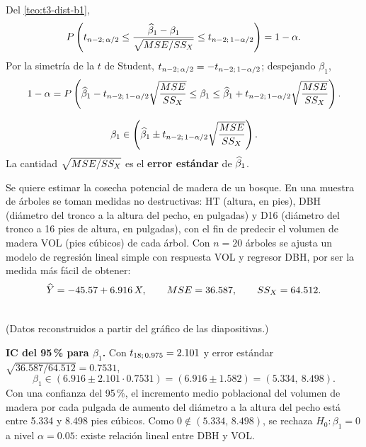 Del \cref{teo:t3-dist-b1},
\[
  P\left(t_{n-2;\,\alpha/2} \le \frac{\widehat{\beta}_1-\beta_1}{\sqrt{MSE/SS_X}}
  \le t_{n-2;\,1-\alpha/2}\right) = 1-\alpha .
\]
Por la simetría de la $t$ de Student, $t_{n-2;\,\alpha/2}=-t_{n-2;\,1-\alpha/2}$; despejando
$\beta_1$,
\[
  1-\alpha = P\left(\widehat{\beta}_1-t_{n-2;\,1-\alpha/2}\sqrt{\frac{MSE}{SS_X}}
  \le \beta_1 \le
  \widehat{\beta}_1+t_{n-2;\,1-\alpha/2}\sqrt{\frac{MSE}{SS_X}}\right).
\]

\begin{resumen}
  \[
    \beta_1 \in \left(\widehat{\beta}_1 \pm t_{n-2;\,1-\alpha/2}\sqrt{\frac{MSE}{SS_X}}\right).
  \]
  La cantidad $\sqrt{MSE/SS_X}$ es el \textbf{error estándar} de $\widehat{\beta}_1$.
\end{resumen}

\begin{ejemplo}
  Se quiere estimar la cosecha potencial de madera de un bosque. En una muestra de árboles se
  toman medidas no destructivas: HT (altura, en pies), DBH (diámetro del tronco a la altura del
  pecho, en pulgadas) y D16 (diámetro del tronco a 16 pies de altura, en pulgadas), con el fin
  de predecir el volumen de madera VOL (pies cúbicos) de cada árbol. Con $n=20$ árboles se
  ajusta un modelo de regresión lineal simple con respuesta VOL y regresor DBH, por ser la
  medida más fácil de obtener:
  \[
    \widehat{Y} = -45.57 + 6.916\,X, \qquad MSE = 36.587, \qquad SS_X = 64.512 .
  \]
  \begin{center}
    \\
    {\footnotesize (Datos reconstruidos a partir del gráfico de las diapositivas.)}
  \end{center}
  \textbf{IC del 95\,\% para $\beta_1$.} Con $t_{18;\,0.975}=2.101$ y error estándar
  $\sqrt{36.587/64.512}=0.7531$,
  \[
    \beta_1 \in (6.916 \pm 2.101\cdot0.7531) = (6.916\pm1.582) = (5.334,\ 8.498).
  \]
  Con una confianza del 95\,\%, el incremento medio poblacional del volumen de madera por cada
  pulgada de aumento del diámetro a la altura del pecho está entre 5.334 y 8.498 pies cúbicos.
  Como $0\notin(5.334,\,8.498)$, se rechaza $H_0\colon\beta_1=0$ a nivel $\alpha=0.05$: existe
  relación lineal entre DBH y VOL.
\end{ejemplo}

